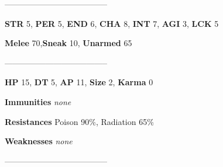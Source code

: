 \documentclass[11pt,a4paper,twocolumn]{book}
\begin{document}
--------------------------------------

\noindent
\textbf{STR} 5, \textbf{PER} 5, \textbf{END} 6, \textbf{CHA} 8, \textbf{INT} 7, \textbf{AGI} 3, \textbf{LCK} 5

\noindent
\textbf{Melee} 70,\textbf{Sneak} 10, \textbf{Unarmed} 65	 

--------------------------------------

\noindent
\textbf{HP} 15, \textbf{DT} 5, \textbf{AP} 11, \textbf{Size} 2, \textbf{Karma} 0


\noindent
\textbf{Immunities} \emph{none} %

\noindent
\textbf{Resistances} Poison 90\%, Radiation 65\%%

\noindent
\textbf{Weaknesses} \emph{none}%

--------------------------------------	
	
\end{document}
